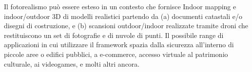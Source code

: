 Il fotorealismo può essere esteso in un contesto che fornisce Indoor mapping e indoor/outdoor 3D di modelli realistici
partendo da (a) documenti catastali e/o disegni di costruzione, e (b) scansioni outdoor/indoor realizzate tramite droni
che restituiscono un set di fotografie e di nuvole di punti.
Il possibile range di applicazioni in cui utilizzare il framework spazia dalla sicurezza all'interno di piccole aree
o edifici pubblici, a e-commerce, accesso virtuale al patrimonio culturale, ai videogames, e molti altri ancora.
\newpage
